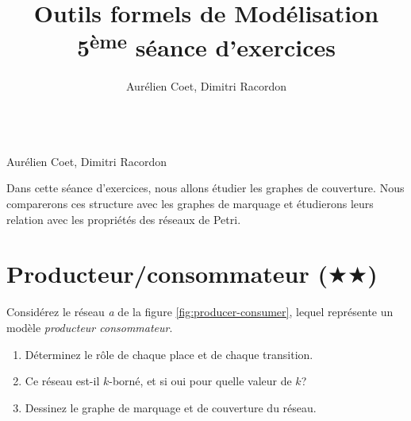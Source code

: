 \documentclass[a4paper, titlepage]{article}
\makeatletter
\newcommand\objective[1]{\def\@objective{#1}}
\newcommand{\makecustomtitle}{%
	\begin{center}
		\huge\@title \\
		[1ex]\small Aurélien Coet, Dimitri Racordon
	\end{center}
	\@objective
}
\makeatother
\begin{document}
\title{Outils formels de Modélisation \\ 5\textsuperscript{ème} séance d'exercices}
\author{Aurélien Coet, Dimitri Racordon}
\objective{
  Dans cette séance d'exercices, nous allons étudier les graphes de couverture.
  Nous comparerons ces structure avec les graphes de marquage et étudierons leurs relation avec les propriétés des réseaux de Petri.
}

\makecustomtitle

\section{Producteur/consommateur ($\bigstar\bigstar$)}

Considérez le réseau \emph{a} de la figure \ref{fig:producer-consumer},
lequel représente un modèle \emph{producteur consommateur}.

\begin{enumerate}
  \item Déterminez le rôle de chaque place et de chaque transition.
  \item Ce réseau est-il $k$-borné, et si oui pour quelle valeur de $k$?
  \item Dessinez le graphe de marquage et de couverture du réseau.
\end{enumerate}
\end{document}
